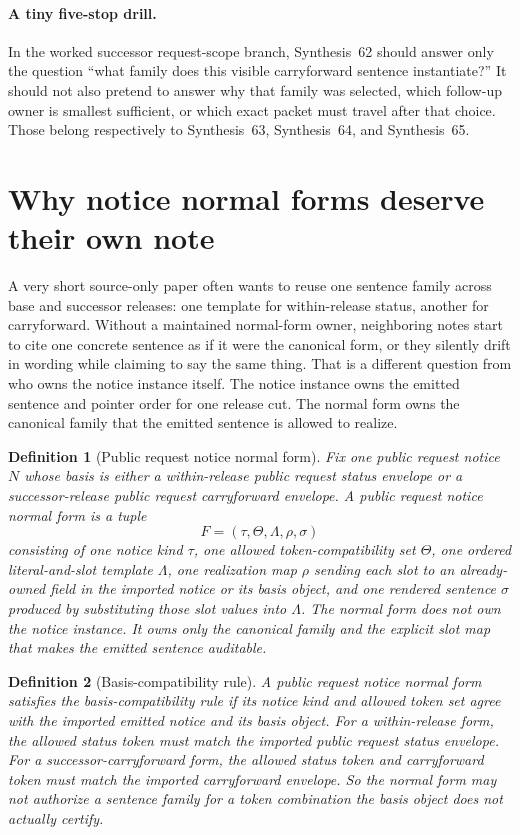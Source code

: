 \documentclass[11pt]{article}
\newtheorem{definition}{Definition}
\begin{document}
\paragraph{A tiny five-stop drill.}
In the worked successor request-scope branch, Synthesis~62 should answer only the question ``what family does this visible carryforward sentence instantiate?'' It should not also pretend to answer why that family was selected, which follow-up owner is smallest sufficient, or which exact packet must travel after that choice. Those belong respectively to Synthesis~63, Synthesis~64, and Synthesis~65.

\section{Why notice normal forms deserve their own note}
A very short source-only paper often wants to reuse one sentence family across base and successor releases: one template for within-release status, another for carryforward.
Without a maintained normal-form owner, neighboring notes start to cite one concrete sentence as if it were the canonical form, or they silently drift in wording while claiming to say the same thing.
That is a different question from who owns the notice instance itself.
The notice instance owns the emitted sentence and pointer order for one release cut.
The normal form owns the canonical family that the emitted sentence is allowed to realize.

\begin{definition}[Public request notice normal form]
Fix one public request notice $N$ whose basis is either a within-release public request status envelope or a successor-release public request carryforward envelope.
A \emph{public request notice normal form} is a tuple
\[
F=(\tau,\Theta,\Lambda,\rho,\sigma)
\]
consisting of one notice kind $\tau$, one allowed token-compatibility set $\Theta$, one ordered literal-and-slot template $\Lambda$, one realization map $\rho$ sending each slot to an already-owned field in the imported notice or its basis object, and one rendered sentence $\sigma$ produced by substituting those slot values into $\Lambda$.
The normal form does not own the notice instance.
It owns only the canonical family and the explicit slot map that makes the emitted sentence auditable.
\end{definition}

\begin{definition}[Basis-compatibility rule]
A public request notice normal form satisfies the \emph{basis-compatibility rule} if its notice kind and allowed token set agree with the imported emitted notice and its basis object.
For a within-release form, the allowed status token must match the imported public request status envelope.
For a successor-carryforward form, the allowed status token and carryforward token must match the imported carryforward envelope.
So the normal form may not authorize a sentence family for a token combination the basis object does not actually certify.
\end{definition}
\end{document}
